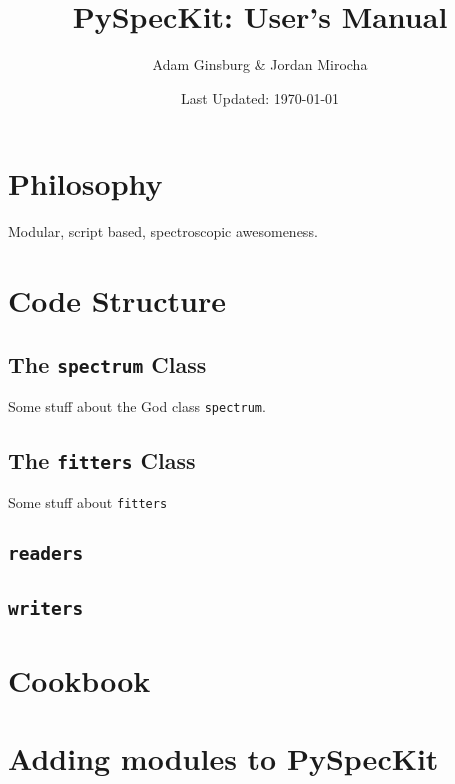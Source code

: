 \documentclass[letterpaper,titlepage,12pt]{article}
\numberwithin{equation}{section}
\begin{document}
	
\author{Adam Ginsburg \& Jordan Mirocha}	
	
\title{\Large {\bf PySpecKit: User's Manual}}
\date{Last Updated: \today}
\maketitle

\setcounter{tocdepth}{2}
\tableofcontents
\newpage

\section{Philosophy}
Modular, script based, spectroscopic awesomeness.

\section{Code Structure}

\subsection{The \texttt{spectrum} Class}
Some stuff about the God class \texttt{spectrum}.
\subsection{The \texttt{fitters} Class}
Some stuff about \texttt{fitters}
\subsection{\texttt{readers}}
\subsection{\texttt{writers}}


\section{Cookbook}



\section{Adding modules to PySpecKit}
\end{document}
